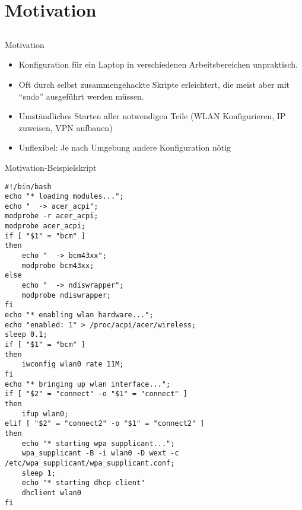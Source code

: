 \section{Motivation}
\subsection{}
\begin{frame}[<+-| alert@+>]{Motivation}
	\begin{itemize}
		\item Konfiguration für ein Laptop in verschiedenen Arbeitsbereichen unpraktisch. \\
		\item Oft durch selbst zusammengehackte Skripte erleichtert, die meist aber mit ``sudo'' ausgeführt werden müssen.
		\item Umständliches Starten aller notwendigen Teile (WLAN Konfigurieren, IP zuweisen, VPN aufbauen)
		\item Unflexibel: Je nach Umgebung andere Konfiguration nötig
	\end{itemize}
\end{frame}

\begin{frame}[fragile]{Motivation-Beispielskript}
\fontsize{4.8}{5.8} \selectfont
\begin{verbatim}
#!/bin/bash
echo "* loading modules...";
echo "  -> acer_acpi";
modprobe -r acer_acpi;
modprobe acer_acpi;
if [ "$1" = "bcm" ]
then
    echo "  -> bcm43xx";
    modprobe bcm43xx;
else
    echo "  -> ndiswrapper";
    modprobe ndiswrapper;
fi
echo "* enabling wlan hardware...";
echo "enabled: 1" > /proc/acpi/acer/wireless;
sleep 0.1;
if [ "$1" = "bcm" ]
then
    iwconfig wlan0 rate 11M;
fi
echo "* bringing up wlan interface...";
if [ "$2" = "connect" -o "$1" = "connect" ]
then
    ifup wlan0;
elif [ "$2" = "connect2" -o "$1" = "connect2" ]
then
    echo "* starting wpa supplicant...";
    wpa_supplicant -B -i wlan0 -D wext -c /etc/wpa_supplicant/wpa_supplicant.conf;
    sleep 1;
    echo "* starting dhcp client"
    dhclient wlan0
fi
\end{verbatim}
\end{frame}
